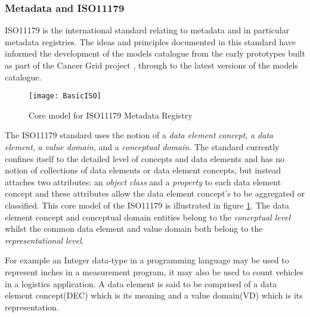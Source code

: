 \subsubsection{Metadata and ISO11179}
ISO11179 is the international standard relating to metadata and in particular metadata registries. The ideas and principles documented in this standard have informed the development of the models catalogue from the early prototypes built as part of the Cancer Grid project \cite{crichton2009metadata}, through to the latest versions of the models catalogue.

\begin{figure}[here]
	\texttt{[image: BasicISO]}
	\caption{Core model for ISO11179 Metadata Registry} 
	\label{fig:basicMDR}
\end{figure}

The ISO11179 standard uses the notion of a \emph{data element concept}, \emph{a data element}, \emph{a value domain}, and a \emph{conceptual domain}. The standard currently confines itself to the detailed level of concepts and data elements and has no notion of collections of data elements or data element concepts, but instead attaches two attributes: an \emph{object class} and a \emph{property} to each data element concept and these attributes allow the data element concept's to be aggregated or classified. This core model of the ISO11179 is illustrated in figure \ref{fig:basicMDR}. The data element concept and conceptual domain entities belong to the \emph{conceptual level}  whilst the common data element and value domain both belong to the \emph{representational level}.


For example an Integer data-type in a programming language may be used to represent inches in a measurement program, it may also be used to count vehicles in a logistics application.  A data element is said to be comprised of a data element concept(DEC) which is its meaning and a value domain(VD) which is its representation.


